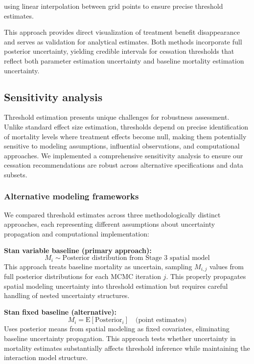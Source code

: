 \documentclass[11pt]{article}\usepackage[]{graphicx}\usepackage[]{xcolor}
\begin{document}
using linear interpolation between grid points to ensure precise threshold estimates.

This approach provides direct visualization of treatment benefit disappearance and serves as validation for analytical estimates. Both methods incorporate full posterior uncertainty, yielding credible intervals for cessation thresholds that reflect both parameter estimation uncertainty and baseline mortality estimation uncertainty.

\subsection{Sensitivity analysis}

Threshold estimation presents unique challenges for robustness assessment. Unlike standard effect size estimation, thresholds depend on precise identification of mortality levels where treatment effects become null, making them potentially sensitive to modeling assumptions, influential observations, and computational approaches. We implemented a comprehensive sensitivity analysis to ensure our cessation recommendations are robust across alternative specifications and data subsets.

\subsubsection{Alternative modeling frameworks}

We compared threshold estimates across three methodologically distinct approaches, each representing different assumptions about uncertainty propagation and computational implementation:

\textbf{Stan variable baseline (primary approach):}
\begin{equation}
M_i \sim \text{Posterior distribution from Stage 3 spatial model}
\end{equation}
This approach treats baseline mortality as uncertain, sampling $M_{i,j}$ values from full posterior distributions for each MCMC iteration $j$. This properly propagates spatial modeling uncertainty into threshold estimation but requires careful handling of nested uncertainty structures.

\textbf{Stan fixed baseline (alternative):}
\begin{equation}
M_i = \text{E}[\text{Posterior}_{i}] \quad \text{(point estimates)}
\end{equation}
Uses posterior means from spatial modeling as fixed covariates, eliminating baseline uncertainty propagation. This approach tests whether uncertainty in mortality estimates substantially affects threshold inference while maintaining the interaction model structure.
\end{document}
